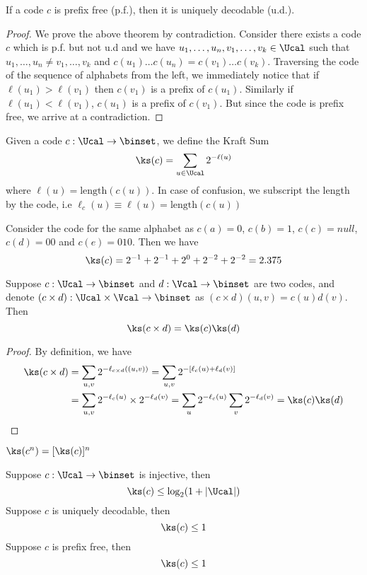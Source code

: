 \begin{theorem}
If a code $c$ is prefix free (p.f.), then it is uniquely decodable (u.d.).
\end{theorem}
\begin{proof}
We prove the above theorem by contradiction. Consider there exists a code $c$ which is p.f. but not u.d and we have $u_1, \dots, u_n, v_1, \dots, v_k \in \Ucal$ such that $u_1, \dots, u_n \neq v_1, \dots, v_k$ and $c(u_1)\dots c(u_n) = c(v_1)\dots c(v_k)$. Traversing the code of the sequence of alphabets from the left, we immediately notice that if $\ell(u_1) > \ell(v_1)$ then $c(v_1)$ is a prefix of $c(u_1)$. Similarly if $\ell(u_1) < \ell(v_1)$, $c(u_1)$ is a prefix of $c(v_1)$. But since the code is prefix free, we arrive at a contradiction.
\end{proof}
\begin{definition}
Given a code $c: \Ucal \to \binset$, we define the Kraft Sum
\[\ks(c) = \sum_{u \in \Ucal} 2^{-\ell(u)}\] where $\ell(u) = \text{length}(c(u))$. In case of confusion, we subscript the length by the code, i.e $\ell_c(u) \equiv \ell(u) = \text{length}(c(u))$
\end{definition}
\begin{eg}
Consider the code for the same alphabet as $c(a) = 0$, $c(b) = 1$, $c(c) = null$, $c(d) = 00$ and $c(e) = 010$. Then we have
\[
    \ks(c) = 2^{-1} + 2^{-1} + 2^0 + 2^{-2} + 2^{-2} = 2.375
\]
\end{eg}
\begin{lemma}
Suppose $c:\Ucal \to \binset$ and $d:\Vcal \to \binset$ are two codes, and denote $(c\times d): \Ucal \times \Vcal \to \binset$ as $(c\times d)(u,v) = c(u)d(v)$. Then 
\[\ks(c\times d) = \ks(c)\ks(d)\]
\end{lemma}
\begin{proof}
By definition, we have
\begin{align*}
    \ks(c\times d) &= \sum_{u,v} 2^{-\ell_{c\times d}((u,v))} = \sum_{u,v} 2^{-[\ell_c(u) + \ell_d(v)]} \\
    &= \sum_{u,v} 2^{-\ell_c(u)} \times 2^{-\ell_d(v)} = \sum_u 2^{-\ell_c(u)} \sum_v 2^{-\ell_d(v)} = \ks(c)\ks(d)
\end{align*}
\end{proof}
\begin{corollary}
$\ks(c^n) = [\ks(c)]^n$
\end{corollary}
\begin{theorem}
Suppose $c: \Ucal \to \binset$ is injective, then
\[\ks(c) \leq \log_2(1+|\Ucal|)\]
Suppose $c$ is uniquely decodable, then
\[\ks(c) \leq 1\]
Suppose $c$ is prefix free, then
\[\ks(c) \leq 1\]
\end{theorem}
